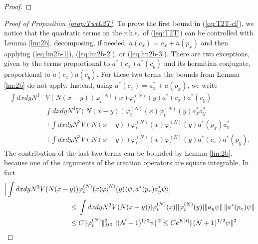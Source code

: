 \documentclass[11pt,a4paper]{article}
\newcommand{\ekt}{e^{K\lvert t\rvert}}	%
\newcommand{\cN}{{\cal N}}
\begin{document}
\begin{proof}
\end{proof} 

\begin{proof}[Proof of Proposition \ref{prop:TwtL2T}]
To prove the first bound in (\ref{eq:T2T-cl}), we notice that the quadratic terms on the r.h.s.\ of (\ref{eq:T2T}) can be controlled with Lemma \ref{lm:2b}, decomposing, if needed, $a (c_x) = a_x + a(p_x)$ and then applying (\ref{eq:lm2b-1}), (\ref{eq:lm2b-2}), or (\ref{eq:lm2b-3}). There are two exceptions, given by the terms proportional to $a^* (c_x) a^* (c_y)$ and its hermitian conjugate, proportional to $a (c_x) a(c_y)$. For these two terms the bounds from Lemma \ref{lm:2b} do not apply. Instead, using $a^* (c_x) = a^*_x + a (p_x)$, we write 
\begin{equation}\label{eq:2-cancel} \begin{split} 
\int dx dy N^3 & V(N (x-y)) \varphi_t^{(N)} (x) \varphi_t^{(N)} (y) a^* (c_x) a^* (c_y) \\ = \; &   
\int dx dy N^3 V(N (x-y)) \varphi_t^{(N)} (x) \varphi_t^{(N)} (y) a_x^* a_y^* \\ &+ 
\int dx dy N^3 V(N (x-y)) \varphi_t^{(N)} (x) \varphi_t^{(N)} (y) a^* (p_x) a_y^* \\ &+ 
\int dx dy N^3 V(N (x-y)) \varphi_t^{(N)} (x) \varphi_t^{(N)} (y) a^* (c_x) a^* (p_y).
 \end{split} \end{equation}
The contribution of the last two terms can be bounded by Lemma \ref{lm:2b}, because one of the arguments of the creation operators are square integrable. In fact
\[ \begin{split} \Big| \int dx dy N^3 V(N (x-y)) &\varphi_t^{(N)} (x) \varphi_t^{(N)} (y)  \langle \psi , a^* (p_x) a_y^* \psi \rangle \Big| \\ \leq \; & \int dx dy N^3 V(N (x-y)) |\varphi_t^{(N)} (x)| |\varphi_t^{(N)} (y)|   \| a_y \psi \| \, \| a^* (p_x) \psi \|   \\ \leq \; & C \| \varphi_t^{(N)} \|_{H^2}^2 \, \| (\cN+1)^{1/2} \psi \|^2 \leq C \ekt \| (\cN+1)^{1/2} \psi \|^2

\end{split}\]
\end{proof}
\end{document}
